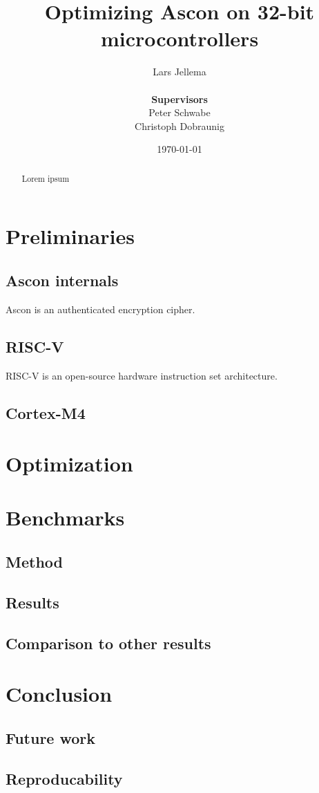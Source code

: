 \documentclass{article}
\title{Optimizing Ascon on 32-bit microcontrollers}
\author{
    Lars Jellema \\\\
    \textbf{\small Supervisors} \\
    \small Peter Schwabe \\
    \small Christoph Dobraunig
}
\date{\today}
\begin{document}
\maketitle

\begin{abstract}
Lorem ipsum
\end{abstract}

\clearpage



\section{Preliminaries}

\subsection{Ascon internals}
Ascon\cite{ascon} is an authenticated encryption cipher.

\subsection{RISC-V}
RISC-V\cite{riscv} is an open-source hardware instruction set architecture.

\subsection{Cortex-M4}

\section{Optimization}




\section{Benchmarks}

\subsection{Method}

\subsection{Results}

\subsection{Comparison to other results}

\section{Conclusion}

\subsection{Future work}




\clearpage
\begin{appendices}
\section{Reproducability}

\end{appendices}
\end{document}
